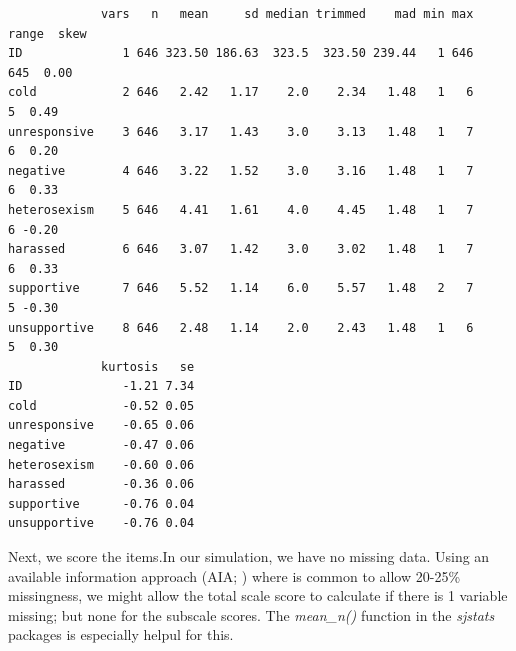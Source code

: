 \documentclass[
  english,
]{book}
\begin{document}
\begin{verbatim}
             vars   n   mean     sd median trimmed    mad min max range  skew
ID              1 646 323.50 186.63  323.5  323.50 239.44   1 646   645  0.00
cold            2 646   2.42   1.17    2.0    2.34   1.48   1   6     5  0.49
unresponsive    3 646   3.17   1.43    3.0    3.13   1.48   1   7     6  0.20
negative        4 646   3.22   1.52    3.0    3.16   1.48   1   7     6  0.33
heterosexism    5 646   4.41   1.61    4.0    4.45   1.48   1   7     6 -0.20
harassed        6 646   3.07   1.42    3.0    3.02   1.48   1   7     6  0.33
supportive      7 646   5.52   1.14    6.0    5.57   1.48   2   7     5 -0.30
unsupportive    8 646   2.48   1.14    2.0    2.43   1.48   1   6     5  0.30
             kurtosis   se
ID              -1.21 7.34
cold            -0.52 0.05
unresponsive    -0.65 0.06
negative        -0.47 0.06
heterosexism    -0.60 0.06
harassed        -0.36 0.06
supportive      -0.76 0.04
unsupportive    -0.76 0.04
\end{verbatim}

Next, we score the items.In our simulation, we have no missing data. Using an available information approach (AIA; \citep{parent_handling_2013}) where is common to allow 20-25\% missingness, we might allow the total scale score to calculate if there is 1 variable missing; but none for the subscale scores. The \emph{mean\_n()} function in the \emph{sjstats} packages is especially helpul for this.
\end{document}
